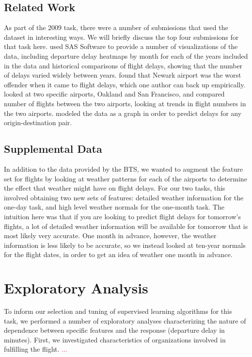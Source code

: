 \documentclass{article}
\begin{document}
\subsection{Related Work}

As part of the 2009 task, there were a number of submissions that used the dataset in interesting ways. We will briefly discuss the top four submissions for that task here. \cite{wicklin2009congestion} used SAS Software to provide a number of visualizations of the data, including departure delay heatmaps by month for each of the years included in the data and historical comparisons of flight delays, showing that the number of delays varied widely between years. \cite{hofmann2011delayed} found that Newark airport was the worst offender when it came to flight delays, which one author can back up empirically. \cite{wickham2011tale} looked at two specific airports, Oakland and San Francisco, and compared number of flights between the two airports, looking at trends in flight numbers in the two airports. \cite{dey2009minimizing} modeled the data as a graph in order to predict delays for any origin-destination pair.

\subsection{Supplemental Data}

In addition to the data provided by the BTS, we wanted to augment the feature set for flights by looking at weather patterns for each of the airports to determine the effect that weather might have on flight delays. For our two tasks, this involved obtaining two new sets of features: detailed weather information for the one-day task, and high level weather normals for the one-month task. The intuition here was that if you are looking to predict flight delays for tomorrow's flights, a lot of detailed weather information will be available for tomorrow that is most likely very accurate. One month in advance, however, the weather information is less likely to be accurate, so we instead looked at ten-year normals for the flight dates, in order to get an idea of weather one month in advance.


\section{Exploratory Analysis}
\label{sec:exploratory}

To inform our selection and tuning of supervised learning algorithms for this task, we performed a number of exploratory analyses characterizing the nature of dependence between specific features and the response (departure delay in minutes). First, we investigated characteristics of organizations involved in fulfilling the flight. \textcolor{red}{...}
\end{document}
